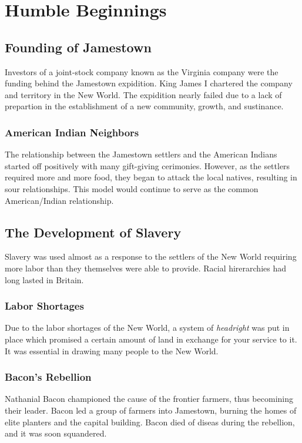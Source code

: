 \chapter{Humble Beginnings}
\section{Founding of Jamestown}
Investors of a joint-stock company known as the Virginia company were the
funding behind the Jamestown expidition.  King James I chartered the company and
territory in the New World.  The expidition nearly failed due to a lack of
prepartion in the establishment of a new community, growth, and sustinance.

\subsection{American Indian Neighbors}
The relationship between the Jamestown settlers and the American Indians started
off positively with many gift-giving cerimonies.  However, as the settlers
required more and more food, they began to attack the local natives, resulting
in sour relationships.  This model would continue to serve as the common
American/Indian relationship.

\section{The Development of Slavery}
Slavery was used almost as a response to the settlers of the New World requiring
more labor than they themselves were able to provide.  Racial hirerarchies had
long lasted in Britain.

\subsection{Labor Shortages}
Due to the labor shortages of the New World, a system of \textit{headright} was
put in place which promised a certain amount of land in exchange for your
service to it.  It was essential in drawing many people to the New World.

\subsection{Bacon's Rebellion}
Nathanial Bacon championed the cause of the frontier farmers, thus becomining
their leader.  Bacon led a group of farmers into Jamestown, burning the homes of
elite planters and the capital building.  Bacon died of diseas during the
rebellion, and it was soon squandered.

